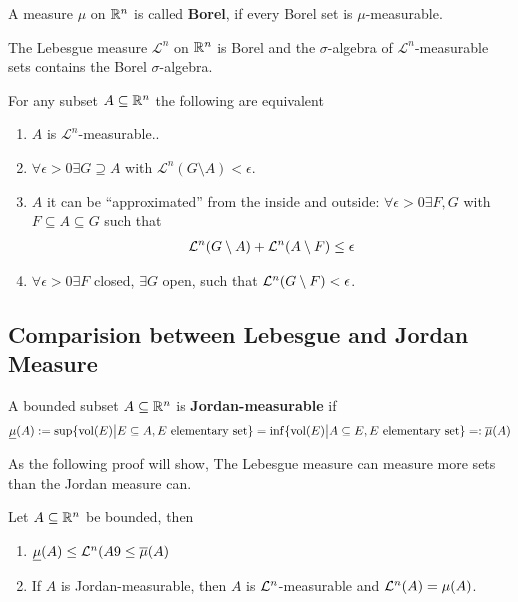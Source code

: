 \begin{dfn}[]
A measure $\mu$ on $\mathbb{R}^{n}$ is called \textbf{Borel}, if every Borel set is $\mu$-measurable.
\end{dfn}

The Lebesgue measure $\mathcal{L}^{n}$ on $\mathbb{R}^{n}$ is Borel and the $\sigma$-algebra of $\mathcal{L}^{n}$-measurable sets contains the Borel $\sigma$-algebra.


\begin{thm}[]
  For any subset $A \subseteq \mathbb{R}^{n}$ the following are equivalent
  \begin{enumerate}
    \item $A$ is $\mathcal{L}^{n}$-measurable..
    \item $\forall \epsilon > 0 \exists G \supseteq A$ with $\mathcal{L}^{n}(G \setminus A) <\epsilon$.
    \item $A$ it can be ``approximated'' from the inside and outside: $\forall \epsilon > 0 \exists F,G$ with $F \subseteq A \subseteq G$ such that
      \begin{align*}
        \mathcal{L}^{n}(G \setminus A) + \mathcal{L}^{n}(A \setminus F) \leq \epsilon
      \end{align*}
    \item $\forall \epsilon > 0 \exists F$ closed, $\exists G$ open, such that $\mathcal{L}^{n}(G \setminus F) < \epsilon$.
  \end{enumerate}
\end{thm}




\subsection{Comparision between Lebesgue and Jordan Measure}
\begin{dfn}[]
A bounded subset $A \subseteq \mathbb{R}^{n}$ is \textbf{Jordan-measurable} if
\begin{align*}
  \underline{\mu}(A)
  :=
  \sup \{\operatorname{vol}(E)\big\vert E \subseteq A, E \text{ elementary set}\} 
  =
  \inf \{\operatorname{vol}(E)\big\vert A \subseteq E, E \text{ elementary set}\} 
  =:
  \overline{\mu}(A)
\end{align*}
\end{dfn}


As the following proof will show, The Lebesgue measure can measure more sets than the Jordan measure can.
\begin{thm}[]
Let $A \subseteq \mathbb{R}^{n}$ be bounded, then
\begin{enumerate}
  \item $\underline{\mu}(A) \leq\mathcal{L}^{n}(A9 \leq \overline{\mu}(A)$
  \item If $A$ is Jordan-measurable, then $A$ is $\mathcal{L}^{n}$-measurable and $\mathcal{L}^{n}(A) = \mu(A)$.
\end{enumerate}
\end{thm}

